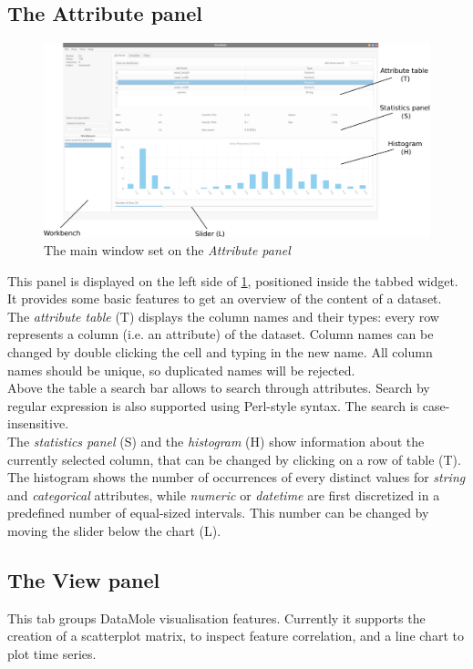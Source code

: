\subsection{The Attribute panel}\label{ssec:att-panel-man}
\begin{figure}
	\centering
	\includegraphics[width=\textwidth]{attribute-panel}
	\caption{The main window set on the \textit{Attribute panel}}
	\label{fig:attribute-panel}
\end{figure}
This panel is displayed on the left side of \cref{fig:attribute-panel}, positioned inside the tabbed widget. It provides some basic features to get an overview of the content of a dataset.\\
The \textit{attribute table} (T) displays the column names and their types: every row represents a column (i.e. an attribute) of the dataset. Column names can be changed by double clicking the cell and typing in the new name. All column names should be unique, so duplicated names will be rejected. \\
Above the table a search bar allows to search through attributes. Search by regular expression is also supported using Perl-style syntax. The search is case-insensitive.\\
The \textit{statistics panel} (S) and the \textit{histogram} (H) show information about the currently selected column, that can be changed by clicking on a row of table (T). The histogram shows the number of occurrences of every distinct values for \textit{string} and \textit{categorical} attributes, while \textit{numeric} or \textit{datetime} are first discretized in a predefined number of equal-sized intervals. This number can be changed by moving the slider below the chart (L).

\subsection{The View panel}\label{ssec:view-panel-man}
This tab groups DataMole visualisation features. Currently it supports the creation of a scatterplot matrix, to inspect feature correlation, and a line chart to plot time series.

